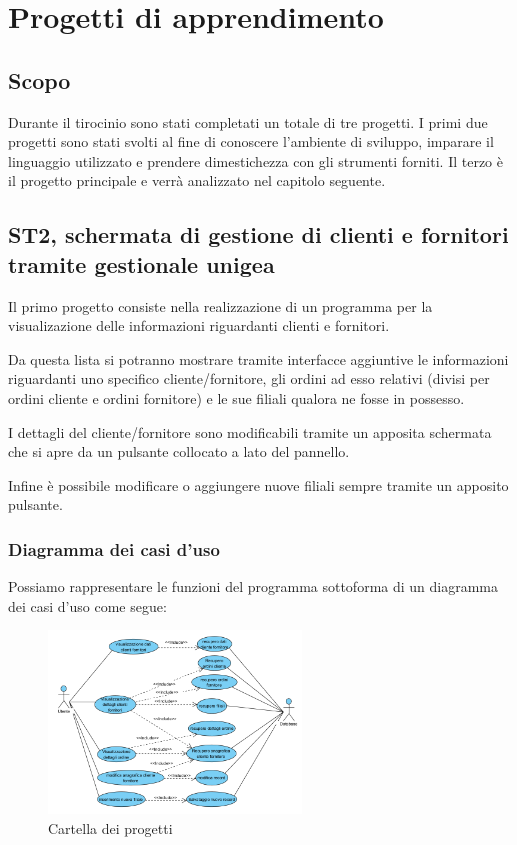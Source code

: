 \documentclass[target=bach,aauheader=,style=]{thud}
\begin{document}

\chapter{Progetti di apprendimento}
\section{Scopo}
Durante il tirocinio sono stati completati un totale di tre progetti.
I primi due progetti sono stati svolti al fine di conoscere l'ambiente di sviluppo, imparare il linguaggio utilizzato e prendere dimestichezza con gli strumenti forniti.
Il terzo è il progetto principale e verrà analizzato nel capitolo seguente.

\section{ST2, schermata di gestione di clienti e fornitori tramite gestionale unigea}
Il primo progetto consiste nella realizzazione di un programma per la visualizazione delle informazioni riguardanti clienti e fornitori.

Da questa lista si potranno mostrare tramite interfacce aggiuntive le informazioni riguardanti uno specifico cliente/fornitore, gli ordini ad esso relativi (divisi per ordini cliente e ordini fornitore) e le sue filiali qualora ne fosse in possesso.

I dettagli del cliente/fornitore sono modificabili tramite un apposita schermata che si apre da un pulsante collocato a lato del pannello.

Infine è possibile modificare o aggiungere nuove filiali sempre tramite un apposito pulsante.

\subsection{Diagramma dei casi d'uso}
Possiamo rappresentare le funzioni del programma sottoforma di un diagramma dei casi d'uso come segue:

\begin{figure}[H]
    \centering
    \includegraphics[width=0.6\textwidth]{diagrammi/caso d'uso 1.png}
    \caption{Cartella dei progetti}
\end{figure}
\end{document}
